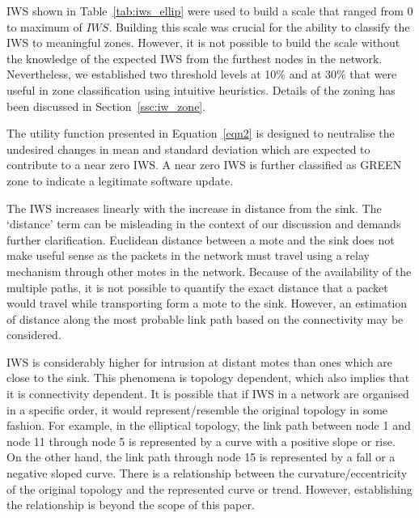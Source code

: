 \documentclass[conference,final]{IEEEtran}
\newcommand{\notedme}[1]{\raisebox{0pt}[0pt][0pt]{\pdfcomment[open=true,color=blue]{#1}}}
\begin{document}
IWS shown in Table~\ref{tab:iws_ellip} were used to build a scale that ranged from $0$ to maximum of $\mathit{IWS}$.
Building this scale was crucial for the ability to classify the IWS to meaningful zones.
However, it is not possible to build the scale without the knowledge of the expected IWS from the furthest nodes in the network.
Nevertheless, we established two threshold levels at 10\% and at 30\% that were useful in zone classification using intuitive heuristics.
Details of the zoning has been discussed in Section~\ref{ssc:iw_zone}.



The utility function presented in Equation~\ref{eqn2} is designed to neutralise the undesired %
changes in mean and standard deviation which are expected to contribute to a near zero IWS.
A near zero IWS is further classified as GREEN zone to indicate a legitimate software update. 

The IWS increases linearly with the increase in distance from the sink.
The `distance' term can be misleading in the context of our discussion and demands further clarification.
Euclidean distance between a mote and the sink does not make useful sense as the packets in the network must travel using a relay mechanism through other motes in the network.
Because of the availability of the multiple paths, it is not possible to quantify the exact distance that a packet would travel while transporting form a mote to the sink.
However, an estimation of distance along the most probable link path based on the connectivity may be considered.

IWS is considerably higher for intrusion at distant motes than ones which are close to the sink.
This phenomena is topology dependent, which also implies  that it is connectivity dependent.
It is possible that if IWS in a network are organised in a specific order, it would represent/resemble   the original topology in some fashion.
For example, in the elliptical topology, the link path between node 1 and node 11 through node 5 is represented by a curve with a positive slope or rise.
On the other hand, the link path through node 15 is represented by a fall or a negative sloped curve.
There is a relationship between the curvature/eccentricity of the original topology and the represented curve or  trend.
However, establishing the relationship is beyond the scope of this paper.
\end{document}
